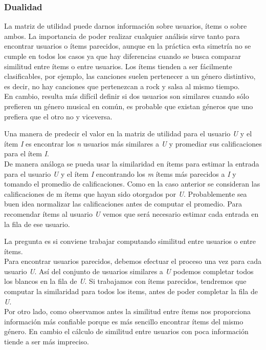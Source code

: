 \subsubsection{Dualidad}

La matriz de utilidad puede darnos información sobre usuarios, ítems o sobre ambos. La importancia de poder realizar cualquier análisis sirve tanto para encontrar usuarios o ítems parecidos, aunque en la práctica esta simetría no se cumple en todos los casos ya que hay diferencias cuando se busca comparar similitud entre ítems o entre usuarios. Los ítems tienden a ser fácilmente clasificables, por ejemplo, las canciones suelen pertenecer a un género distintivo, es decir, no hay canciones que pertenezcan a rock y salsa al mismo tiempo.\\
En cambio, resulta más difícil definir si dos usuarios son similares cuando sólo prefieren un género musical en común, es probable que existan géneros que uno prefiera que el otro no y viceversa.\par

Una manera de predecir el valor en la matriz de utilidad para el usuario \textit{U} y el ítem \textit{I} es encontrar los \textit{n} usuarios más similares a \textit{U} y promediar sus calificaciones para el ítem \textit{I}.  \\
De manera análoga se pueda usar la similaridad en ítems para estimar la entrada para el usuario \textit{U} y el ítem \textit{I} encontrando los \textit{m} ítems más parecidos a \textit{I} y tomando el promedio de calificaciones. Como en la caso anterior se consideran las calificaciones de m ítems que hayan sido otorgados por \textit{U}. Probablemente sea buen idea normalizar las calificaciones antes de computar el promedio. Para recomendar ítems al usuario \textit{U} vemos que será necesario estimar cada entrada en la fila de ese usuario. \par

La pregunta es si conviene trabajar computando similitud entre usuarios o entre ítems. \\
Para encontrar usuarios parecidos, debemos efectuar el proceso una vez para cada usuario \textit{U}. Así del conjunto de usuarios similares a \textit{U} podemos completar todos los blancos en la fila de \textit{U}. 
Si trabajamos con ítems parecidos, tendremos que computar la similaridad para todos los items, antes de poder completar la fila de \textit{U}. \\
Por otro lado, como observamos antes la similitud entre ítems nos proporciona información más confiable porque es más sencillo encontrar ítems del mismo género. En cambio el cálculo de similitud entre usuarios con poca información tiende a ser más impreciso. 

